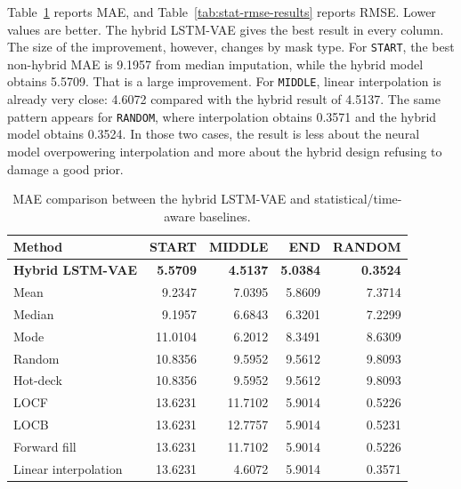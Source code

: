 Table~\ref{tab:stat-mae-results} reports MAE, and Table~\ref{tab:stat-rmse-results} reports RMSE. Lower values are better. The hybrid LSTM-VAE gives the best result in every column. The size of the improvement, however, changes by mask type. For \texttt{START}, the best non-hybrid MAE is 9.1957 from median imputation, while the hybrid model obtains 5.5709. That is a large improvement. For \texttt{MIDDLE}, linear interpolation is already very close: 4.6072 compared with the hybrid result of 4.5137. The same pattern appears for \texttt{RANDOM}, where interpolation obtains 0.3571 and the hybrid model obtains 0.3524. In those two cases, the result is less about the neural model overpowering interpolation and more about the hybrid design refusing to damage a good prior.

\begin{table}[ht]
	\centering
	\small
	\begin{tabular}{lrrrr}
		\toprule
		\textbf{Method} & \textbf{START} & \textbf{MIDDLE} & \textbf{END} & \textbf{RANDOM} \\
		\midrule
		\textbf{Hybrid LSTM-VAE} & \textbf{5.5709} & \textbf{4.5137} & \textbf{5.0384} & \textbf{0.3524} \\
		Mean & 9.2347 & 7.0395 & 5.8609 & 7.3714 \\
		Median & 9.1957 & 6.6843 & 6.3201 & 7.2299 \\
		Mode & 11.0104 & 6.2012 & 8.3491 & 8.6309 \\
		Random & 10.8356 & 9.5952 & 9.5612 & 9.8093 \\
		Hot-deck & 10.8356 & 9.5952 & 9.5612 & 9.8093 \\
		LOCF & 13.6231 & 11.7102 & 5.9014 & 0.5226 \\
		LOCB & 13.6231 & 12.7757 & 5.9014 & 0.5231 \\
		Forward fill & 13.6231 & 11.7102 & 5.9014 & 0.5226 \\
		Linear interpolation & 13.6231 & 4.6072 & 5.9014 & 0.3571 \\
		\bottomrule
	\end{tabular}
	\caption{MAE comparison between the hybrid LSTM-VAE and statistical/time-aware baselines.}
	\label{tab:stat-mae-results}
\end{table}

